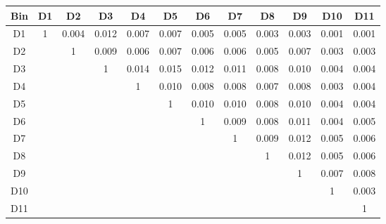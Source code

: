 \begin{tabular}{c@{~~~}c@{~~}c@{~~}c@{~~}c@{~~}c@{~~}c@{~~}c@{~~}c@{~~}c@{~~}c@{~~}c}
\hline 
 \hline 
Bin	& D1 & D2 & D3 & D4 & D5 & D6 & D7 & D8 & D9 & D10 & D11 \\ 
\hline 
D1	&  1 &  0.004 &  0.012 &  0.007 &  0.007 &  0.005 &  0.005 &  0.003 &  0.003 &  0.001 &  0.001 \\  
D2	&   &  1 &  0.009 &  0.006 &  0.007 &  0.006 &  0.006 &  0.005 &  0.007 &  0.003 &  0.003 \\  
D3	&   &   &  1 &  0.014 &  0.015 &  0.012 &  0.011 &  0.008 &  0.010 &  0.004 &  0.004 \\  
D4	&   &   &   &  1 &  0.010 &  0.008 &  0.008 &  0.007 &  0.008 &  0.003 &  0.004 \\  
D5	&   &   &   &   &  1 &  0.010 &  0.010 &  0.008 &  0.010 &  0.004 &  0.004 \\  
D6	&   &   &   &   &   &  1 &  0.009 &  0.008 &  0.011 &  0.004 &  0.005 \\  
D7	&   &   &   &   &   &   &  1 &  0.009 &  0.012 &  0.005 &  0.006 \\  
D8	&   &   &   &   &   &   &   &  1 &  0.012 &  0.005 &  0.006 \\  
D9	&   &   &   &   &   &   &   &   &  1 &  0.007 &  0.008 \\  
D10	&   &   &   &   &   &   &   &   &   &  1 &  0.003 \\  
D11	&   &   &   &   &   &   &   &   &   &   &  1 \\  
\hline 
 \hline 
\end{tabular}